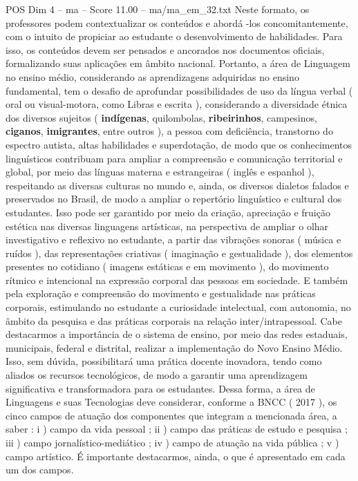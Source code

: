 \begin{textsample}{POS Dim 4 – ma – Score 11.00 – ma/ma\_em\_32.txt}
Neste formato, os professores podem contextualizar os conteúdos e abordá -los concomitantemente, com o intuito de propiciar ao estudante o desenvolvimento de habilidades.
Para isso, os conteúdos devem ser pensados e ancorados nos documentos oficiais, formalizando suas aplicações em âmbito nacional.
Portanto, a área de Linguagem no ensino médio, considerando as aprendizagens adquiridas no ensino fundamental, tem o desafio de aprofundar possibilidades de uso da língua verbal ( oral ou visual-motora, como Libras e escrita ), considerando a diversidade étnica dos diversos sujeitos ( \textbf{indígenas}, quilombolas, \textbf{ribeirinhos}, campesinos, \textbf{ciganos}, \textbf{imigrantes}, entre outros ), a pessoa com deficiência, transtorno do espectro autista, altas habilidades e superdotação, de modo que os conhecimentos linguísticos contribuam para ampliar a compreensão e comunicação territorial e global, por meio das línguas materna e estrangeiras ( inglês e espanhol ), respeitando as diversas culturas no mundo e, ainda, os diversos dialetos falados e preservados no Brasil, de modo a ampliar o repertório linguístico e cultural dos estudantes.
Isso pode ser garantido por meio da criação, apreciação e fruição estética nas diversas linguagens artísticas, na perspectiva de ampliar o olhar investigativo e reflexivo no estudante, a partir das vibrações sonoras ( música e ruídos ), das representações criativas ( imaginação e gestualidade ), dos elementos presentes no cotidiano ( imagens estáticas e em movimento ), do movimento rítmico e intencional na expressão corporal das pessoas em sociedade.
E também pela exploração e compreensão do movimento e gestualidade nas práticas corporais, estimulando no estudante a curiosidade intelectual, com autonomia, no âmbito da pesquisa e das práticas corporais na relação inter/intrapessoal.
Cabe destacarmos a importância de o sistema de ensino, por meio das redes estaduais, municipais, federal e distrital, realizar a implementação do Novo Ensino Médio.
Isso, sem dúvida, possibilitará uma prática docente inovadora, tendo como aliados os recursos tecnológicos, de modo a garantir uma aprendizagem significativa e transformadora para os estudantes.
Dessa forma, a área de Linguagens e suas Tecnologias deve considerar, conforme a BNCC ( 2017 ), os cinco campos de atuação dos componentes que integram a mencionada área, a saber : i ) campo da vida pessoal ; ii ) campo das práticas de estudo e pesquisa ; iii ) campo jornalístico-mediático ; iv ) campo de atuação na vida pública ; v ) campo artístico.
É importante destacarmos, ainda, o que é apresentado em cada um dos campos.

\end{textsample}
